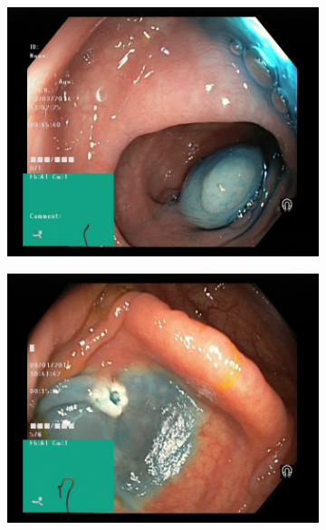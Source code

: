  
    



    \begin{figure}[h!]
        \centering
        \begin{subfigure}[b]{0.4\textwidth}
            \centering
            \includegraphics[width=\textwidth]{experiments/images/dyed-lifted-polyps.jpg}
            \caption[Is this in use]%
            {{\small  }}    
            \label{fig:polypAEGREEN}
        \end{subfigure}
        \qquad
        \begin{subfigure}[b]{0.4\textwidth}  
            \centering 
            \includegraphics[width=\textwidth]{experiments/images/dyed-resection-margins.jpg}

\end{subfigure}
\end{figure}
